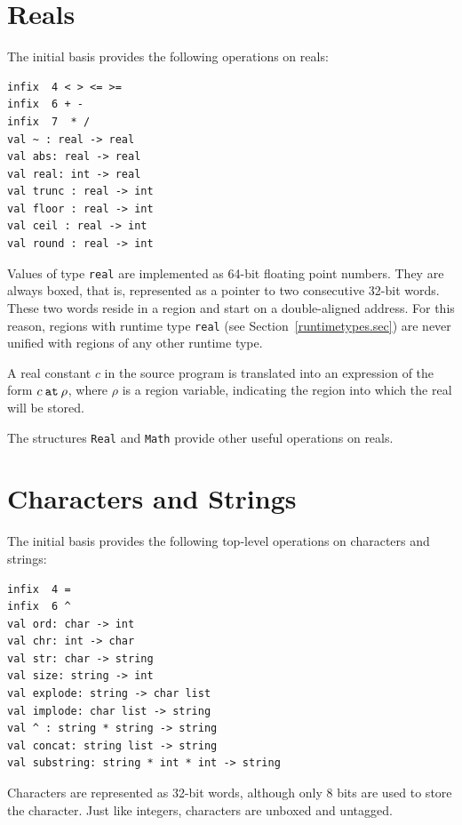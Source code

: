 \documentclass[12pt]{book}
\begin{document}
\section{Reals}
The initial basis provides the following operations on reals:
\index{{\tt =}}\index{{\tt <>}}\index{{\tt <}}\index{{\tt >}}\index{{\tt <=}}\index{{\tt >=}}\index{{\tt +}}\index{{\tt -}}\index{{\tt *}}\index{{\tt /}}\index{\verb+~+}
\begin{verbatim}
infix  4 < > <= >= 
infix  6 + - 
infix  7  * /
val ~ : real -> real
val abs: real -> real
val real: int -> real
val trunc : real -> int
val floor : real -> int
val ceil : real -> int
val round : real -> int
\end{verbatim}
Values of type {\tt real} are implemented as 64-bit floating point
numbers.  They are always boxed, that is, represented as a pointer to
two consecutive 32-bit words.  These two words reside
in a region and start on a double-aligned address. For this reason,
regions with runtime type {\tt real} (see
Section~\ref{runtimetypes.sec}) are never unified with regions of any
other runtime type.

A real constant $c$ in the source program is translated into an
expression of the form $c\mathbin{\hbox{\tt at}}\rho$, where $\rho$ is
a region variable, indicating the region into which the real will be
stored.

The structures {\tt Real} and {\tt Math} provide other useful
operations on reals.

\section{Characters and Strings}
The initial basis provides the following top-level operations on characters and strings:\index{{\tt =}}\index{\verb+^+}
\begin{verbatim}
infix  4 = 
infix  6 ^
val ord: char -> int
val chr: int -> char
val str: char -> string
val size: string -> int
val explode: string -> char list
val implode: char list -> string
val ^ : string * string -> string
val concat: string list -> string
val substring: string * int * int -> string
\end{verbatim}
Characters are represented as 32-bit words, although only 8 bits are
used to store the character. Just like integers, characters are
unboxed and untagged.
\end{document}
